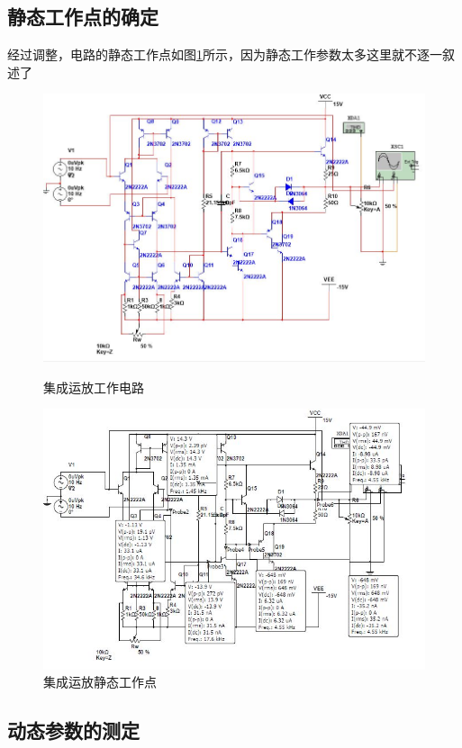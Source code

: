 \documentclass[UTF8,a4paper]{ctexart}
\begin{document}
\subsection{静态工作点的确定}
经过调整，电路的静态工作点如图\ref{static}所示，因为静态工作参数太多这里就不逐一叙述了
\begin{figure}
\centering
\includegraphics[width=\textwidth]{3c.jpg}
\caption{集成运放工作电路}
\label{CCCC}
\includegraphics[width=\textwidth]{3-3static.jpg}
\caption{集成运放静态工作点}
\label{static}
\end{figure}
\subsection{动态参数的测定}
\end{document}
